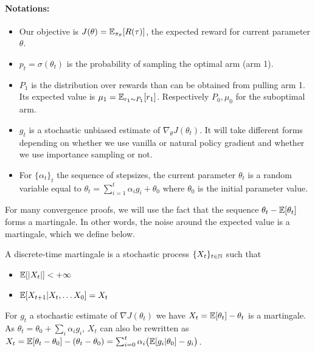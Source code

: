 \paragraph{Notations:}
\begin{itemize}
    \item Our objective is $J(\theta) = \mathbb{E}_{\pi_\theta} [R(\tau)]$, the expected reward for current parameter $\theta$.
    \item $p_t = \sigma(\theta_t)$ is the probability of sampling the optimal arm (arm 1).
    \item $P_1$ is the distribution over rewards than can be obtained from pulling arm 1. Its expected value is $\mu_1 = \mathbb{E}_{r_1 \sim P_1}[r_1]$. Respectively $P_0, \mu_0$ for the suboptimal arm.
    \item $g_t$ is a stochastic unbiased estimate of $\nabla_\theta J(\theta_t)$. It will take different forms depending on whether we use vanilla or natural policy gradient and whether we use importance sampling or not.
    \item For $\{ \alpha_t\}_t$ the sequence of stepsizes, the current parameter $\theta_t$ is a random variable equal to $\theta_t = \sum_{i=1}^t \alpha_i g_i + \theta_0$ where $\theta_0$ is the initial parameter value.
\end{itemize}


For many convergence proofs, we will use the fact that the sequence $\theta_t - \mathbb{E}[\theta_t]$ forms a martingale. In other words, the noise around the expected value is a martingale, which we define below.
\begin{definition}[Martingale] A discrete-time martingale is a stochastic process $\{X_t\}_{t\in {\mathbb{N}}}$ such that
\begin{itemize}
    \item $\mathbb{E}[|X_t|]  <  +\infty$
    \item $\mathbb{E}[X_{t+1} | X_t, \dots X_0] = X_t$
\end{itemize}

\end{definition}
\begin{example} For $g_t$ a stochastic estimate of $\nabla J(\theta_t)$ we have
$X_t = \mathbb{E}[\theta_t] - \theta_t$  is a martingale. As $\theta_t = \theta_0 + \sum_i \alpha_i g_i$, $X_t$ can also be rewritten as
$X_t = \mathbb{E}[\theta_t - \theta_0] - (\theta_t-\theta_0) = \sum_{i=0}^{t} \alpha_i \big(\mathbb{E}[ g_i | \theta_0] -  g_i \big)$.%
\end{example}

